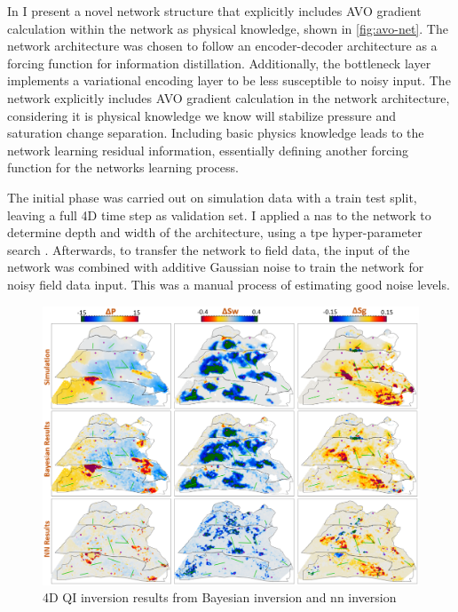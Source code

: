 In \citet{dramsch2019including} I present a novel network structure that explicitly includes AVO gradient calculation within the network as physical knowledge, shown in \cref{fig:avo-net}. The network architecture was chosen to follow an encoder-decoder architecture as a forcing function for information distillation. Additionally, the bottleneck layer implements a variational encoding layer to be less susceptible to noisy input. The network explicitly includes AVO gradient calculation in the network architecture, considering it is physical knowledge we know will stabilize pressure and saturation change separation. Including basic physics knowledge leads to the network learning residual information, essentially defining another forcing function for the networks learning process.

The initial phase was carried out on simulation data with a train test split, leaving a full 4D time step as validation set. I applied a \acl{nas} to the network to determine depth and width of the architecture, using a \ac{tpe} hyper-parameter search \citep{bergstra2015hyperopt}. Afterwards, to transfer the network to field data, the input of the network was combined with additive Gaussian noise \citep{bishop1995training} to train the network for noisy field data input. This was a manual process of estimating good noise levels.

\begin{figure}
    \centering
    \includegraphics[width=\textwidth]{figures/NN_results.PNG}
    \caption{4D QI inversion results from Bayesian inversion and \acl{nn} inversion \citep[from][]{dramsch2019deep}}
    \label{fig:avo-net-results}
\end{figure}

